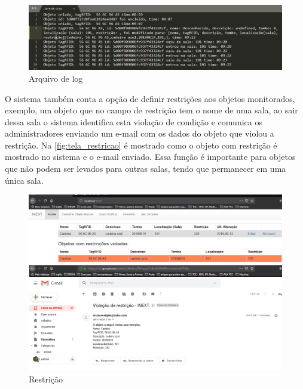 \begin{figure}[H]
              \caption{\label{fig:tela_log}Arquivo de log}
              \centering
              \includegraphics[width=1\textwidth]{Figuras/tela_logs.png}
\end{figure}
\par
O sistema também conta a opção de definir restrições aos objetos monitorados, exemplo, um objeto que no campo de restrição tem o nome de uma sala, ao sair dessa sala o sistema identifica esta violação de condição e comunica os administradores enviando um e-mail com os dados do objeto que violou a restrição. Na \autoref{fig:tela_restricao} é mostrado como o objeto com restrição é mostrado no sistema e o e-mail enviado. Essa função é importante para objetos que não podem ser levados para outras salas, tendo que permanecer em uma única sala. 
\begin{figure}[H]
              \caption{\label{fig:tela_restricao}Restrição}
              \centering
              \includegraphics[width=1\textwidth]{Figuras/tela_restricao.png}
\end{figure}


